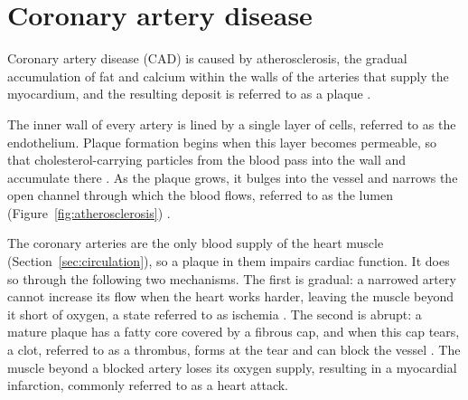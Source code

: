 
\section{Coronary artery disease}
\label{sec:disease}


Coronary artery disease (CAD) is caused by atherosclerosis, the gradual accumulation of fat and calcium within the walls of the arteries that supply the myocardium, and the resulting deposit is referred to as a plaque \cite{libby2019atherosclerosis}.

The inner wall of every artery is lined by a single layer of cells, referred to as the endothelium.
Plaque formation begins when this layer becomes permeable, so that cholesterol-carrying particles from the blood pass into the wall and accumulate there \cite{libby2019atherosclerosis}.
As the plaque grows, it bulges into the vessel and narrows the open channel through which the blood flows, referred to as the lumen (Figure~\ref{fig:atherosclerosis}) \cite{libby2019atherosclerosis}.

The coronary arteries are the only blood supply of the heart muscle (Section~\ref{sec:circulation}), so a plaque in them impairs cardiac function.
It does so through the following two mechanisms.
The first is gradual: a narrowed artery cannot increase its flow when the heart works harder, leaving the muscle beyond it short of oxygen, a state referred to as ischemia \cite{duncker2015regulation}.
The second is abrupt: a mature plaque has a fatty core covered by a fibrous cap, and when this cap tears, a clot, referred to as a thrombus, forms at the tear and can block the vessel \cite{libby2019atherosclerosis,rampidis2022geometry}.
The muscle beyond a blocked artery loses its oxygen supply, resulting in a myocardial infarction, commonly referred to as a heart attack.

